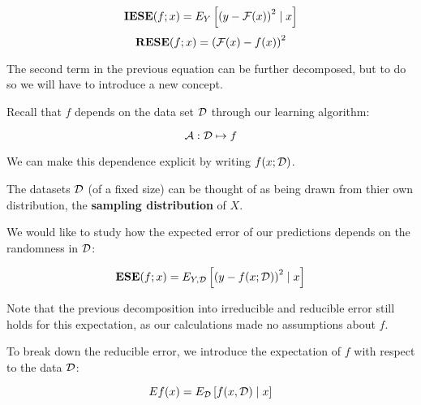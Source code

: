 %
%
\begin{frame}
  $$ \operatorname*{\mathbf{IESE}}(f; x) = E_Y \left[ \left( y - \operatorname*{\mathcal{F}}(x) \right)^2 \mid x \right] $$
  $$ \operatorname*{\mathbf{RESE}}(f; x) = \left( \operatorname*{\mathcal{F}}(x) - f(x) \right)^2 $$
\end{frame}
%
%
\begin{frame}
  The second term in the previous equation can be further decomposed, but to do
  so we will have to introduce a new concept.  
\end{frame}
%
%
\begin{frame}
  Recall that $f$ depends on the data set $\operatorname*{\mathcal{D}}$ through our learning algorithm:

  $$ \operatorname*{\mathcal{A}} : \operatorname*{\mathcal{D}} \mapsto f $$

  We can make this dependence explicit by writing $f(x; \operatorname*{\mathcal{D}})$.
\end{frame}
%
%
\begin{frame}
  The datasets $\operatorname*{\mathcal{D}}$ (of a fixed size) can be thought of as being drawn from
  thier own distribution, the \textbf{sampling distribution} of $X$.   
\end{frame}
%
%
\begin{frame}
  We would like to study how the expected error of our predictions depends on
  the randomness in $\operatorname*{\mathcal{D}}$:

  $$ \operatorname*{\mathbf{ESE}}(f; x) = E_{Y,\operatorname*{\mathcal{D}}} \left[ \left( y - f(x; \operatorname*{\mathcal{D}}) \right)^2 \mid x \right]
  $$

  Note that the previous decomposition into irreducible and reducible error
  still holds for this expectation, as our calculations made no assumptions
  about $f$.
\end{frame}
%
%
\begin{frame}
  To break down the reducible error, we introduce the expectation of $f$ with
  respect to the data $\operatorname*{\mathcal{D}}$:

  $$ Ef(x) = E_{\operatorname*{\mathcal{D}}} \left[ f(x, \operatorname*{\mathcal{D}}) \mid x \right] $$
\end{frame}
%
%
